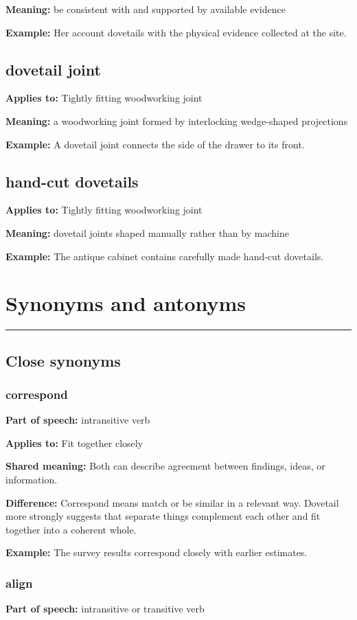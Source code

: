 \documentclass[11pt]{article}
\newcommand{\sectionrule}{\par\vspace{-0.5em}\noindent\textcolor{Accent}{\rule{\linewidth}{0.6pt}}\par}
\begin{document}
\textbf{Meaning:} be consistent with and supported by available evidence

\textbf{Example:} Her account dovetails with the physical evidence collected at the site.

\subsection{dovetail joint}
\textbf{Applies to:} Tightly fitting woodworking joint

\textbf{Meaning:} a woodworking joint formed by interlocking wedge-shaped projections

\textbf{Example:} A dovetail joint connects the side of the drawer to its front.

\subsection{hand-cut dovetails}
\textbf{Applies to:} Tightly fitting woodworking joint

\textbf{Meaning:} dovetail joints shaped manually rather than by machine

\textbf{Example:} The antique cabinet contains carefully made hand-cut dovetails.

\section{Synonyms and antonyms}
\sectionrule
\subsection{Close synonyms}
\subsubsection{correspond}
\textbf{Part of speech:} intransitive verb

\textbf{Applies to:} Fit together closely

\textbf{Shared meaning:} Both can describe agreement between findings, ideas, or information.

\textbf{Difference:} Correspond means match or be similar in a relevant way. Dovetail more strongly suggests that separate things complement each other and fit together into a coherent whole.

\textbf{Example:} The survey results correspond closely with earlier estimates.

\subsubsection{align}
\textbf{Part of speech:} intransitive or transitive verb
\end{document}
